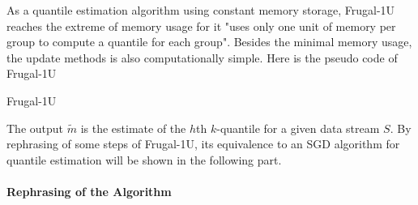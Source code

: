 As a quantile estimation algorithm using constant memory storage, Frugal-1U reaches the extreme of memory usage for it "uses only one unit of memory per group to compute a quantile for each group"\cite{maFrugalStreamingEstimating2014}. Besides the minimal memory usage, the update methods is also computationally simple. Here is the pseudo code of Frugal-1U
\begin{algorithm}
\caption{Frugal-1U}\label{alg:frugal_1U}
    \begin{algorithmic}[1]
                \EndIf
            \EndFor
    \end{algorithmic}
\end{algorithm}
The output $\tilde{m}$ is the estimate of the $h$th $k$-quantile for a given data stream $S$. 
By rephrasing of some steps of Frugal-1U, 
its equivalence to an SGD algorithm for quantile estimation will be shown in the following part.
\\\\
\textbf{Rephrasing of the Algorithm} \label{replacements}
